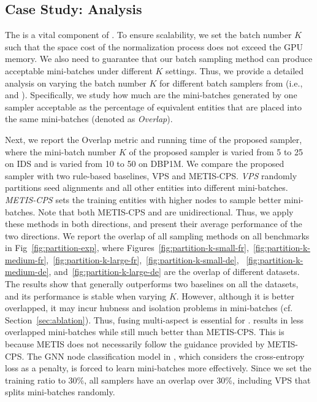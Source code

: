 \subsection{Case Study: \Sampling{} Analysis}
\label{sec:exp_minibatchgeneration}

The \Sampling{} is a vital component of \ClusterEA{}. To ensure scalability, we set the batch number $K$ such that the space cost of the normalization process does not exceed the GPU memory. We also need to guarantee that our batch sampling method can produce acceptable mini-batches under different $K$ settings.
Thus, we provide a detailed analysis on varying the batch number $K$ for different batch samplers from \Sampling{} (i.e., \MetisGCN{} and \KMeans{}). Specifically, we study how much are the mini-batches generated by one sampler acceptable as the percentage of equivalent entities that are placed into the same mini-batches (denoted as \textit{Overlap}).

Next, we report the Overlap metric and running time of the proposed sampler, where the mini-batch number $K$ of the proposed sampler is varied from 5 to 25 on IDS and is varied from 10 to 50 on DBP1M. We compare the proposed sampler with two rule-based baselines, VPS and METIS-CPS. \emph{VPS} randomly partitions seed alignments and all other entities into different mini-batches. \emph{METIS-CPS} sets the training entities with higher nodes to sample better mini-batches.
Note that both METIS-CPS and \MetisGCN{} are unidirectional. Thus, we apply these methods in both directions, and present their average performance of the two directions. We report the overlap of all sampling methods on all benchmarks in Fig~\ref{fig:partition-exp}, where Figures~\ref{fig:partition-k-small-fr},~\ref{fig:partition-k-medium-fr},~\ref{fig:partition-k-large-fr},~\ref{fig:partition-k-small-de}, ~\ref{fig:partition-k-medium-de}, and~\ref{fig:partition-k-large-de} are the overlap of different datasets. The results show that \KMeans{} generally outperforms two baselines on all the datasets, and its performance is stable when varying $K$. However, although it is better overlapped, it may incur hubness and isolation problems in mini-batches (cf. Section~\ref{sec:ablation}). Thus, fusing multi-aspect is essential for \ClusterEA{}. \MetisGCN{} results in less overlapped mini-batches while still much better than METIS-CPS. This is because METIS does not necessarily follow the guidance provided by METIS-CPS. The GNN node classification model in \MetisGCN{}, which considers the cross-entropy loss as a penalty, is forced to learn mini-batches more effectively. Since we set the training ratio to 30\%, all samplers have an overlap over 30\%, including VPS that splits mini-batches randomly.

